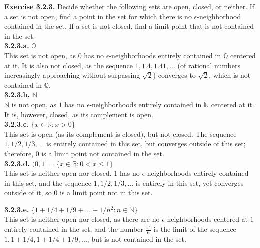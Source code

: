 \documentclass[12pt,letterpaper]{article}
\begin{document}
\textbf{Exercise 3.2.3.} Decide whether the following sets are open, closed, or neither. If a set is not open, find a point in the set for which there is no \(\epsilon\)-neighborhood contained in the set. If a set is not closed, find a limit point that is not contained in the set. \\

\textbf{3.2.3.a.} \(\mathbb{Q}\) \\

This set is not open, as \(0\) has no \(\epsilon\)-neighborhoods entirely contained in \(\mathbb{Q}\) centered at it. It is also not closed, as the sequence \(1, 1.4, 1.41, ...\) (of rational numbers increasingly approaching without surpassing \(\sqrt{2}\)) converges to \(\sqrt{2}\), which is not contained in \(\mathbb{Q}\). \\

\textbf{3.2.3.b.} \(\mathbb{N}\) \\

\(\mathbb{N}\) is not open, as \(1\) has no \(\epsilon\)-neighborhoods entirely contained in \(\mathbb{N}\) centered at it. It is, however, closed, as its complement is open. \\

\textbf{3.2.3.c.} \(\{x \in \mathbb{R} : x > 0\}\) \\

This set is open (as its complement is closed), but not closed. The sequence \(1, 1/2, 1/3,...\) is entirely contained in this set, but converges outside of this set; therefore, \(0\) is a limit point not contained in the set. \\

\textbf{3.2.3.d.} \((0, 1] = \{x \in \mathbb{R} : 0 < x \leq 1\}\) \\

This set is neither open nor closed. \(1\) has no \(\epsilon\)-neighborhoods entirely contained in this set, and the sequence \(1, 1/2, 1/3, ...\) is entirely in this set, yet converges outside of it, so \(0\) is a limit point not in this set.

\textbf{3.2.3.e.} \(\{1 + 1/4 + 1/9 + ... + 1/n^{2} : n \in \mathbb{N}\}\) \\

This set is neither open nor closed, as there are no \(\epsilon\)-neighborhoods centered at \(1\) entirely contained in the set, and the number \(\frac{\pi^{2}}{6}\) is the limit of the sequence \(1, 1+1/4, 1+1/4+1/9, ...\), but is not contained in the set. \\
\end{document}
